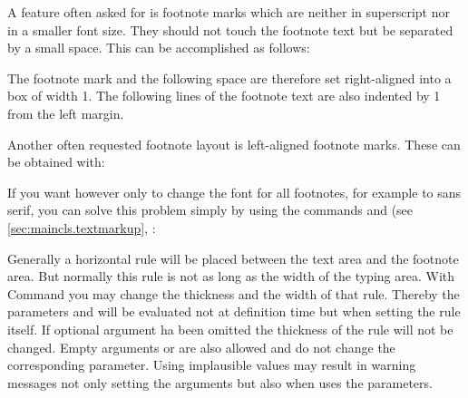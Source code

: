 \ifCommonscrlttr\else
\begin{Example}
  \label{desc:maincls.cmd.deffootnote.example}%
  A feature often asked for is footnote marks which are
  neither in superscript nor in a smaller font size. They should not touch the
  footnote text but be separated by a small space. This can be accomplished as
  follows:
\begin{lstcode}
\end{lstcode}
  The footnote mark and the following space are therefore set
  right-aligned into a box of width 1. The following lines of
  the footnote text are also indented by 1 from the left
  margin.
  
  Another often requested footnote layout is left-aligned
  footnote marks. These can be obtained with:
\begin{lstcode}
\end{lstcode}
  
  If you want however only to change the font for all footnotes, for example
  to sans serif, you can solve this problem simply by using the commands
   and  (see
  \autoref{sec:maincls.textmarkup},
  :
\begin{lstcode}
\end{lstcode}
\end{Example}%
%
\fi%
%
%
%
%
%
%
%
%
%


\begin{Declaration}
\end{Declaration}%
%
Generally a horizontal
rule will be placed between the text area and the footnote area. But normally
this rule is not as long as the width of the typing area. With Command
 you may change the thickness and the width of that
rule. Thereby the parameters  and  will be
evaluated not at definition time but when setting the rule itself. If
optional argument  ha been omitted the thickness of the rule
will not be changed. Empty arguments  or  are
also allowed and do not change the corresponding parameter. Using implausible
values may result in warning messages not only setting the arguments but also
when \KOMAScript{} uses the parameters.

